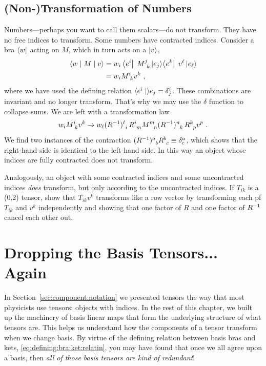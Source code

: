 \documentclass[12pt, oneside]{report}    %
\let\oldsection\section
\def\section{%
  \setcounter{sidenote}{1}%
  \oldsection
}
\begin{document}
\subsection{(Non-)Transformation of Numbers}

Numbers---perhaps you want to call them scalars---do not transform. They have no free indices to transform. Some numbers have contracted indices. Consider a bra $\left\langle w\right|$ acting on $M$, which in turn acts on a $\left|v\right\rangle$,
\begin{align}
    \la w \mid M \mid v \ra 
    &= 
    w_i \bra{e^i} \; M\aij{j}{k}\ket{e_j}\!\bra{e^k}
    \; v^\ell \ket{e_\ell} 
    \\&=
    w_i M\aij{i}{k}v^k 
    \ ,
\end{align}
where we have used the defining relation $\langle e^i\mid \rangle e_j = \delta^i_j$. These combinations are invariant and no longer transform. That's why we may use the $\delta$ function to collapse sums. We are left with a transformation law
\begin{align}
    w_i M\aij{i}{k}v^k 
    \to 
    w_\ell(R\inv)\aij{\ell}{i} \, R\aij{i}{m}
    M\aij{m}{n} (R\inv)\aij{n}{k} \, R\aij{k}{p} v^p \ .
\end{align}
We find two instances of the contraction $(R\inv)\aij{a}{b}R\aij{b}{c} \equiv \delta^a_c$, which shows that the right-hand side is identical to the left-hand side. In this way an object whose indices are fully contracted does not transform. 

\begin{exercise}
Analogously, an object with some contracted indices and some uncontracted indices \emph{does} transform, but only according to the uncontracted indices. If $T_{ik}$ is a (0,2) tensor, show that $T_{ik}v^k$ transforms like a row vector by transforming each pf $T_{ik}$ and $v^k$ independently and showing that one factor of $R$ and one factor of $R^{-1}$ cancel each other out.
\end{exercise}




\section{Dropping the Basis Tensors... Again}

In Section~\ref{sec:component:notation} we presented tensors the way that most physicists use tensors: objects with indices. In the rest of this chapter, we built up the machinery of basis linear maps that form the underlying structure of what tensors are. This helps us understand how the components of a tensor transform when we change basis. By virtue of the defining relation between basis bras and kets, \eqref{eq:defining:bra:ket:relatin}, you may have found that once we all agree upon a basis, then \emph{all of those basis tensors are kind of redundant}!
\end{document}
